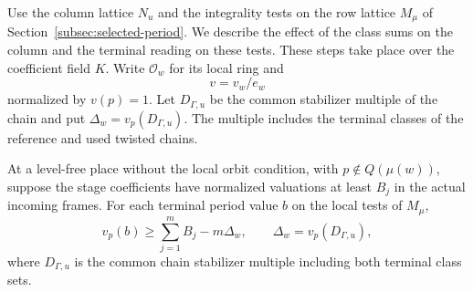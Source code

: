 \hypertarget{source-terminal-period}{}
Use the column lattice \(N_u\) and the integrality tests on the row lattice \(M_\mu\) of Section~\ref{subsec:selected-period}. We describe
the effect of the class sums on the column and the terminal
reading on these tests. These steps take place over the
coefficient field \(K\). Write \(\mathcal O_w\) for its local
ring and 
\[
  v=v_w/e_w
\]
 normalized by \(v(p)=1\). Let \(D_{\Gamma,u}\) be the
common stabilizer multiple of the chain and put
\(\Delta_w=v_p(D_{\Gamma,u})\). The multiple includes the
terminal classes of the reference and used twisted chains.

\begin{proposition}\label{prop:unserved-terminal-valuation}
At a level-free place without the local orbit condition,
with \(p\notin Q(\mu(w))\), suppose the stage coefficients
have normalized valuations at least \(B_j\) in the actual
incoming frames. For each terminal period value \(b\) on the local tests of \(M_\mu\),
\[
 v_p(b)\ge\sum_{j=1}^m B_j-m\Delta_w,\qquad \Delta_w=v_p(D_{\Gamma,u}),
\]
where \(D_{\Gamma,u}\) is the common
chain stabilizer multiple including both terminal class sets.
\end{proposition}

